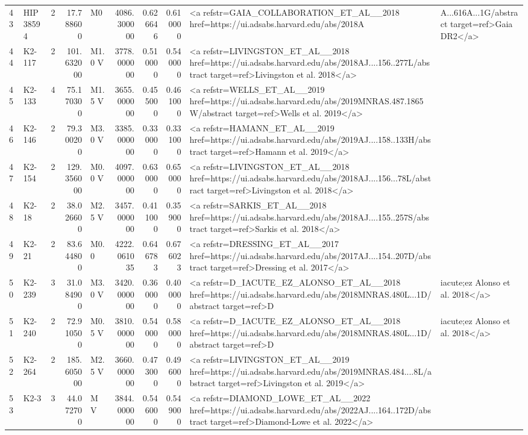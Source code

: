 \begin{tabular}{llrrlrrrl}
43 & HIP 38594 & 2 & 17.788600 & M0 & 4086.300000 & 0.626646 & 0.610000 & <a refstr=GAIA_COLLABORATION_ET_AL__2018 href=https://ui.adsabs.harvard.edu/abs/2018A&A...616A...1G/abstract target=ref>Gaia DR2</a> \\
44 & K2-117 & 2 & 101.632000 & M1.0 V & 3778.000000 & 0.510000 & 0.540000 & <a refstr=LIVINGSTON_ET_AL__2018 href=https://ui.adsabs.harvard.edu/abs/2018AJ....156..277L/abstract target=ref>Livingston et al. 2018</a> \\
45 & K2-133 & 4 & 75.170300 & M1.5 V & 3655.000000 & 0.455000 & 0.461000 & <a refstr=WELLS_ET_AL__2019 href=https://ui.adsabs.harvard.edu/abs/2019MNRAS.487.1865W/abstract target=ref>Wells et al. 2019</a> \\
46 & K2-146 & 2 & 79.300200 & M3.0 V & 3385.000000 & 0.330000 & 0.331000 & <a refstr=HAMANN_ET_AL__2019 href=https://ui.adsabs.harvard.edu/abs/2019AJ....158..133H/abstract target=ref>Hamann et al. 2019</a> \\
47 & K2-154 & 2 & 129.356000 & M0.0 V & 4097.000000 & 0.630000 & 0.650000 & <a refstr=LIVINGSTON_ET_AL__2018 href=https://ui.adsabs.harvard.edu/abs/2018AJ....156...78L/abstract target=ref>Livingston et al. 2018</a> \\
48 & K2-18 & 2 & 38.026600 & M2.5 V & 3457.000000 & 0.411000 & 0.359000 & <a refstr=SARKIS_ET_AL__2018 href=https://ui.adsabs.harvard.edu/abs/2018AJ....155..257S/abstract target=ref>Sarkis et al. 2018</a> \\
49 & K2-21 & 2 & 83.644800 & M0.0 & 4222.061035 & 0.646783 & 0.676023 & <a refstr=DRESSING_ET_AL__2017 href=https://ui.adsabs.harvard.edu/abs/2017AJ....154..207D/abstract target=ref>Dressing et al. 2017</a> \\
50 & K2-239 & 3 & 31.084900 & M3.0 V & 3420.000000 & 0.360000 & 0.400000 & <a refstr=D_IACUTE_EZ_ALONSO_ET_AL__2018 href=https://ui.adsabs.harvard.edu/abs/2018MNRAS.480L...1D/abstract target=ref>D&iacute;ez Alonso et al. 2018</a> \\
51 & K2-240 & 2 & 72.910500 & M0.5 V & 3810.000000 & 0.540000 & 0.580000 & <a refstr=D_IACUTE_EZ_ALONSO_ET_AL__2018 href=https://ui.adsabs.harvard.edu/abs/2018MNRAS.480L...1D/abstract target=ref>D&iacute;ez Alonso et al. 2018</a> \\
52 & K2-264 & 2 & 185.605000 & M2.5 V & 3660.000000 & 0.473000 & 0.496000 & <a refstr=LIVINGSTON_ET_AL__2019 href=https://ui.adsabs.harvard.edu/abs/2019MNRAS.484....8L/abstract target=ref>Livingston et al. 2019</a> \\
53 & K2-3 & 3 & 44.072700 & M V & 3844.000000 & 0.546000 & 0.549000 & <a refstr=DIAMOND_LOWE_ET_AL__2022 href=https://ui.adsabs.harvard.edu/abs/2022AJ....164..172D/abstract target=ref>Diamond-Lowe et al. 2022</a> \\

\end{tabular}
